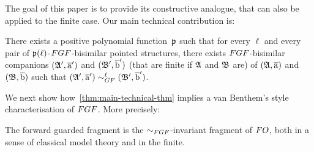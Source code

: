 The goal of this paper is to provide its constructive analogue, that can also be applied to the finite case.
Our main technical contribution is:
\begin{theorem}\label{thm:main-technical-thm}
  There exists a positive polynomial function~$\mathfrak{p}$ such that for every $\ell$ and every pair of $\mathfrak{p}(\ell)$-$\FGF$-bisimilar pointed structures, there exists $\FGF$-bisimilar companions $({\mathfrak{A}}', \overline{\mathrm{a}}')$ and $({\mathfrak{B}}', \overline{\mathrm{b}}')$ (that are finite if ${\mathfrak{A}}$ and ${\mathfrak{B}}$ are) of $({\mathfrak{A}}, \overline{\mathrm{a}})$ and $({\mathfrak{B}}, \overline{\mathrm{b}})$ such that $(\str{A}', \elemtuplea') \bisimto^{\ell}_{\GF} (\str{B}', \elemtupleb')$.
\end{theorem}
We next show how~\cref{thm:main-technical-thm} implies a van Benthem's style characterisation of $\FGF$. More precisely:
\begin{theorem}
The forward guarded fragment is the $\bisimto_{\FGF}$-invariant fragment of $\FO$, both in a sense of classical model theory and in the finite.
\end{theorem}
